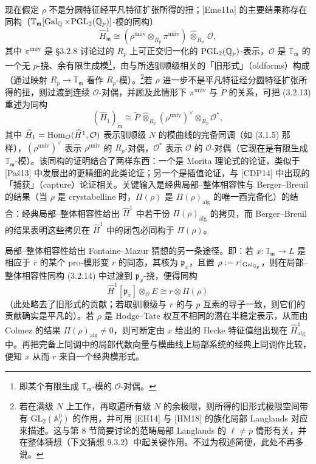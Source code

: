 现在假定 $\rho$ 不是分圆特征经平凡特征扩张所得的扭；[Eme11a] 的主要结果称存在同构（$\mathbb T_{\mathfrak m}[\operatorname{Gal}_{\mathbb{Q}}\times\mathrm{PGL}_2(\mathbb{Q}_p)]$-模的同构）
\begin{equation}\tag{3.2.13}\label{eq:a4-3-2-13}
\widehat H^1_{\mathfrak m}\cong(\rho^{\mathrm{univ}}\otimes_{R_p}\pi^{\mathrm{univ}})\,\widehat{\otimes}_{R_p}\,\mathcal O,
\end{equation}
其中 $\pi^{\mathrm{univ}}$ 是 §3.2.8 讨论过的 $R_p$ 上可正交归一化的 $\mathrm{PGL}_2(\mathbb{Q}_p)$-表示，$\mathcal O$ 是 $\mathbb T_{\mathfrak m}$ 的一个无 $p$-挠、余有限生成模\footnote{即某个有限生成 $\mathbb T_{\mathfrak m}$-模的 $\mathcal O$-对偶。}，由与所选驯顺级相关的「旧形式」（oldforms）构成（通过映射 $R_p\to\mathbb T_{\mathfrak m}$ 看作 $R_p$-模）。\footnote{若在满级 $N$ 上工作，再取遍所有级 $N$ 的余极限，则所得的旧形式极限空间带有 $\mathrm{GL}_2(\mathbb A^p_f)$ 的作用，并可用 [EH14] 与 [HM18] 的族化局部 Langlands 对应来描述。这与第 8 节简要讨论的范畴局部 Langlands 的 $\ell\neq p$ 情形有关，并在整体猜想（下文猜想 9.3.2）中起关键作用。不过为叙述简便，此处不再多说。}若 $\rho$ 进一步不是平凡特征经分圆特征扩张所得的扭，则过渡到连续 $\mathcal O$-对偶，并顾及此情形下 $\pi^{\mathrm{univ}}$ 与 $\widetilde P$ 的关系，可把 (3.2.13) 重述为同构
\begin{equation}\tag{3.2.14}\label{eq:a4-3-2-14}
(\widehat H_1)_{\mathfrak m}\cong\widetilde P\,\widehat{\otimes}_{R_p}(\rho^{\mathrm{univ}})^{\vee}\otimes_{R_p}\mathcal O^{*},
\end{equation}
其中 $\widehat H_1=\operatorname{Hom}_{\mathcal O}(\widehat H^1,\mathcal O)$ 表示驯顺级 $N$ 的模曲线的完备同调（如 (3.1.5) 那样），$(\rho^{\mathrm{univ}})^{\vee}$ 表示 $\rho^{\mathrm{univ}}$ 的 $R_p$-对偶，$\mathcal O^{*}$ 表示 $\mathcal O$ 的 $\mathcal O$-对偶（它现在是有限生成 $\mathbb T_{\mathfrak m}$-模）。该同构的证明结合了两样东西：一个是 Morita 理论式的论证，类似于 [Paš13] 中发展出的更精细的此类论证；另一个是插值论证，与 [CDP14] 中出现的「捕获」（capture）论证相关。关键输入是经典局部--整体相容性与 Berger--Breuil 的结果（当 $\rho$ 是 crystabelline 时，$\Pi(\rho)$ 是 $\Pi(\rho)_{\mathrm{alg}}$ 的唯一酉完备化）的结合：经典局部--整体相容性给出 $\widehat H^1$ 中若干份 $\Pi(\rho)_{\mathrm{alg}}$ 的拷贝，而 Berger--Breuil 的结果表明这些拷贝在 $\widehat H^1$ 中的闭包必同构于 $\Pi(\rho)$。

局部--整体相容性给出 Fontaine--Mazur 猜想的另一条途径。即：若 $x:\mathbb T_{\mathfrak m}\to L$ 是相应于 $\overline{r}$ 的某个 pro-模形变 $r$ 的同态，其核为 $\mathfrak p_x$，且置 $\rho:=r|_{\operatorname{Gal}_{\mathbb{Q}_p}}$，则在局部--整体相容性同构 (3.2.14) 中过渡到 $\mathfrak p_x$-挠，便得同构
\begin{equation}\tag{3.2.15}\label{eq:a4-3-2-15}
\widehat H^1[\mathfrak p_x]\otimes_{\mathcal O}E\cong r\otimes\Pi(\rho)
\end{equation}
（此处略去了旧形式的贡献；若取驯顺级与 $r$ 的与 $p$ 互素的导子一致，则它们的贡献确实是平凡的）。若 $\rho$ 是 Hodge--Tate 权互不相同的潜在半稳定表示，从而由 Colmez 的结果 $\Pi(\rho)_{\mathrm{alg}}\neq0$，则可断定由 $x$ 给出的 Hecke 特征值组出现在 $\widehat H^1_{\mathrm{alg}}$ 中。再把完备上同调中的局部代数向量与模曲线上局部系统的经典上同调作比较，便知 $x$ 从而 $r$ 来自一个经典模形式。

